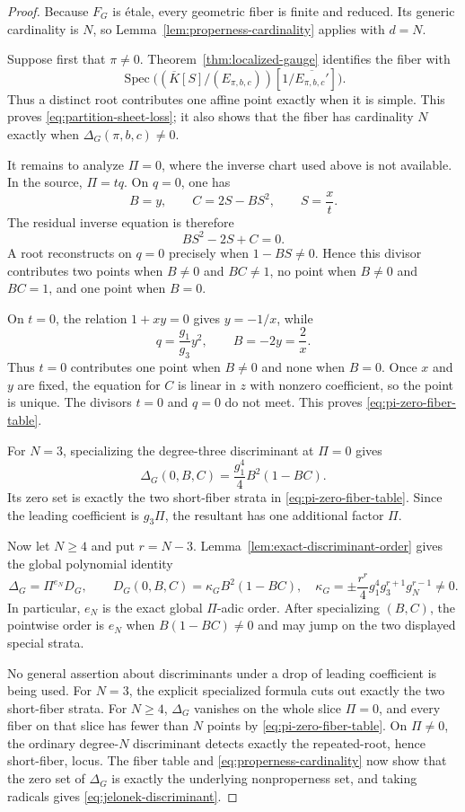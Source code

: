 \begin{proof}
Because \(F_G\) is \'etale, every geometric fiber is finite and reduced.
Its generic cardinality is \(N\), so
Lemma~\ref{lem:properness-cardinality} applies with \(d=N\).

Suppose first that \(\pi\neq0\).  Theorem~\ref{thm:localized-gauge}
identifies the fiber with
\[
 \operatorname{Spec}
 \bigl((\overline K[S]/(E_{\pi,b,c}))[1/\overline{E_{\pi,b,c}'}]\bigr).
\]
Thus a distinct root contributes one affine point exactly when it is simple.
This proves \eqref{eq:partition-sheet-loss}; it also shows that the fiber has
cardinality \(N\) exactly when \(\Delta_G(\pi,b,c)\neq0\).

It remains to analyze \(\Pi=0\), where the inverse chart used above is not
available.  In the source, \(\Pi=tq\).  On \(q=0\), one has
\[
 B=y,\qquad C=2S-BS^2,\qquad S=\frac{x}{t}.
\]
The residual inverse equation is therefore
\begin{equation}
 BS^2-2S+C=0.
 \label{eq:q-zero-residual}
\end{equation}
A root reconstructs on \(q=0\) precisely when \(1-BS\neq0\).  Hence this
divisor contributes two points when \(B\neq0\) and \(BC\neq1\), no point when
\(B\neq0\) and \(BC=1\), and one point when \(B=0\).

On \(t=0\), the relation \(1+xy=0\) gives \(y=-1/x\), while
\[
 q=\frac{g_1}{g_3}y^2,\qquad B=-2y=\frac2x.
\]
Thus \(t=0\) contributes one point when \(B\neq0\) and none when \(B=0\).
Once \(x\) and \(y\) are fixed, the equation for \(C\) is linear in \(z\)
with nonzero coefficient, so the point is unique.  The divisors \(t=0\) and
\(q=0\) do not meet.  This proves \eqref{eq:pi-zero-fiber-table}.

For \(N=3\), specializing the degree-three discriminant at \(\Pi=0\) gives
\[
 \Delta_G(0,B,C)=\frac{g_1^4}{4}B^2(1-BC).
\]
Its zero set is exactly the two short-fiber strata in
\eqref{eq:pi-zero-fiber-table}.  Since the leading coefficient is
\(g_3\Pi\), the resultant has one additional factor \(\Pi\).

Now let \(N\geq4\) and put \(r=N-3\).
Lemma~\ref{lem:exact-discriminant-order} gives the global polynomial
identity
\[
 \Delta_G=\Pi^{e_N}D_G,\qquad
 D_G(0,B,C)=\kappa_GB^2(1-BC),
\quad
 \kappa_G=\pm\frac{r^r}{4}
 g_1^4g_3^{r+1}g_N^{r-1}\neq0.
\]
In particular, \(e_N\) is the exact global \(\Pi\)-adic order.  After specializing
\((B,C)\), the pointwise order is \(e_N\) when
\(B(1-BC)\neq0\) and may jump on the two displayed special strata.

No general assertion about discriminants under a drop of leading coefficient
is being used.  For \(N=3\), the explicit specialized formula cuts out
exactly the two short-fiber strata.  For \(N\geq4\), \(\Delta_G\) vanishes on
the whole slice \(\Pi=0\), and every fiber on that slice has fewer than \(N\)
points by \eqref{eq:pi-zero-fiber-table}.  On \(\Pi\neq0\), the ordinary
degree-\(N\) discriminant detects exactly the repeated-root, hence
short-fiber, locus.
The fiber table and \eqref{eq:properness-cardinality} now show that the zero
set of \(\Delta_G\) is exactly the underlying nonproperness set, and taking
radicals gives \eqref{eq:jelonek-discriminant}.
\end{proof}

